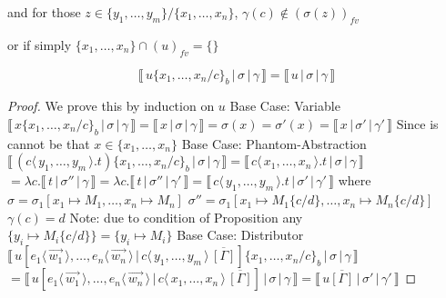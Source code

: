 \documentclass[a4paper,UKenglish,cleveref, autoref]{lipics-v2019}
\newcommand{\fv}[1]{(#1)_{fv}}
\newcommand{\set}[1]{ \{ #1 \} }
\newcommand{\abs}[2]{\lambda #1 . #2}
\newcommand{\fake}[3]{#1 \langle \, #2 \, \rangle . #3}
\newcommand{\dist}[5]{#1 [ #2 \, \vert \, \fakedist{#4}{#5} \, #3 ]}
\newcommand{\fakedist}[2]{#1 \langle \, #2 \, \rangle}
\newcommand{\sub}[3]{#1 \{ #2 / #3 \}}
\newcommand{\psub}[3]{#1 \{ #2 / #3 \}_{b}}
\newcommand{\readbackwmap}[3]{\llbracket \, #1 \, \vert \, #2 \, \vert \, #3  \, \rrbracket }
\begin{document}
and for those $z \in \set{y_{1}, \dots, y_{m}} / \set{x_{1}, \dots, x_{n}}$, $\gamma(c) \not\in \fv{\sigma(z)}$

or if simply $\set{x_{1}, \dots, x_{n}} \cap \fv{u} = \set{}$

$$\readbackwmap{u \psub{}{x_{1}, \dots, x_{n}}{c}}{\sigma}{\gamma} = \readbackwmap{u}{\sigma}{\gamma}$$

\begin{proof}
We prove this by induction on $u$
\newline
\newline
Base Case: Variable
\newline
$\readbackwmap{x \psub{}{x_{1}, \dots, x_{n}}{c}}{\sigma}{\gamma} = \readbackwmap{x}{\sigma}{\gamma} = \sigma(x) = \sigma'(x) = \readbackwmap{x}{\sigma'}{\gamma'}$
\newline
Since is cannot be that $x \in \set{x_{1}, \dots, x_{n}}$
\newline
\newline
Base Case: Phantom-Abstraction
\newline
$\readbackwmap{(\fake{c}{y_{1}, \dots, y_{m}}{t}) \psub{}{x_{1}, \dots, x_{n}}{c}}{\sigma}{\gamma} = \readbackwmap{\fake{c}{x_{1}, \dots, x_{n}}{t}}{\sigma}{\gamma}$
\newline
$= \abs{c}{\readbackwmap{t}{\sigma''}{\gamma}} = \abs{c}{\readbackwmap{t}{\sigma''}{\gamma'}}  = \readbackwmap{\fake{c}{y_{1}, \dots, y_{m}}{t}}{\sigma'}{\gamma'}$
\newline
where
\newline
$\sigma = \sigma_{1} [x_{1} \mapsto M_{1} , \dots ,  x_{n} \mapsto M_{n} ]$
\newline
$\sigma'' = \sigma_{1} [x_{1} \mapsto M_{1} \sub{}{c}{d} , \dots ,  x_{n} \mapsto M_{n} \sub{}{c}{d} ]$
\newline
$\gamma(c) = d$
\newline
Note: due to condition of Proposition any $\set{y_{i} \mapsto M_{i} \sub{}{c}{d}} = \set{ y_{i} \mapsto M_{i} }$
\newline
\newline
Base Case: Distributor
\newline
$\readbackwmap{\dist{u}{\fakedist{e_{1}}{\vec{w_{1}}}, \dots, \fakedist{e_{n}}{\vec{w_{n}}}}{\overline{[\Gamma]}}{c}{y_{1}, \dots, y_{m}}  \psub{}{x_{1}, \dots, x_{n}}{c}}{\sigma}{\gamma}$
\newline
$= \readbackwmap{\dist{u}{\fakedist{e_{1}}{\vec{w_{1}}}, \dots, \fakedist{e_{n}}{\vec{w_{n}}}}{\overline{[\Gamma]}}{c}{x_{1}, \dots, x_{n}} }{\sigma}{\gamma} = \readbackwmap{u \overline{[\Gamma]}}{\sigma'}{\gamma'}$

\end{proof}
\end{document}
